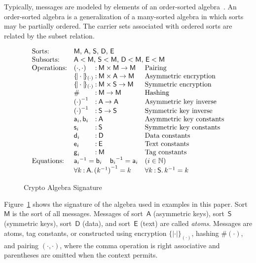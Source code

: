 \documentclass[12pt]{article}
\newcommand{\cn}[1]{\ensuremath{\operatorname{\mathsf{#1}}}}
\newcommand{\srt}[1]{\ensuremath{\mathsf{#1}}}
\newcommand{\typ}{\mathbin:}
\newcommand{\enc}[2]{\ensuremath{\{\!|#1|\!\}_{#2}}}
\newcommand{\invk}[1]{{#1}^{-1}}
\newcommand{\tg}[1]{\cn{g}_{#1}}
\newcommand{\nat}{\ensuremath{\mathbb{N}}}
\newcommand{\all}[1]{\forall#1\mathpunct.}
\begin{document}
Typically, messages are modeled by elements of an order-sorted
algebra~\cite{GoguenMeseguer92}. An order-sorted algebra is a
generalization of a many-sorted algebra in which sorts may be
partially ordered.  The carrier sets associated with ordered sorts are
related by the subset relation.

\begin{figure}
$$\begin{array}{ll@{{}\typ{}}ll}
\mbox{Sorts:}&
\multicolumn{3}{l}{\mbox{$\srt{M}$, $\srt{A}$,
    $\srt{S}$, $\srt{D}$, $\srt{E}$}}\\
\mbox{Subsorts:}&
\multicolumn{3}{l}{\mbox{$\srt{A}<\srt{M}$, $\srt{S}<\srt{M}$,
    $\srt{D}<\srt{M}$, $\srt{E}<\srt{M}$}}\\
\mbox{Operations:}&(\cdot,\cdot)&\srt{M}\times\srt{M}\to\srt{M}& \mbox{Pairing}\\
&\enc{\cdot}{(\cdot)}&\srt{M}\times\srt{A}\to\srt{M}&\mbox{Asymmetric encryption}\\
&\enc{\cdot}{(\cdot)}&\srt{M}\times\srt{S}\to\srt{M}&\mbox{Symmetric encryption}\\
&\#&\srt{\srt{M}}\to\srt{M}& \mbox{Hashing}\\
&\invk{(\cdot)}&\srt{A}\to\srt{A}& \mbox{Asymmetric key inverse}\\
&\invk{(\cdot)}&\srt{S}\to\srt{S}& \mbox{Symmetric key inverse}\\
&\cn{a}_i,\cn{b}_i&\srt{A}& \mbox{Asymmetric key constants}\\
&\cn{s}_i&\srt{S}& \mbox{Symmetric key constants}\\
&\cn{d}_i&\srt{D}& \mbox{Data constants}\\
&\cn{e}_i&\srt{E}& \mbox{Text constants}\\
&\tg{i}&\srt{M}& \mbox{Tag constants}\\
\mbox{Equations:}&\multicolumn{2}{l}{\invk{\cn{a}_i}=\cn{b}_i\quad
\invk{\cn{b}_i}=\cn{a}_i}
&(i\in\nat)\\
&\multicolumn{2}{l}{\all{k\typ\srt{A}}\invk{(\invk{k})}=k}
&\all{k\typ\srt{S}}\invk{k}=k
\end{array}$$
\caption{Crypto Algebra Signature}\label{fig:algebra signature}
\end{figure}

Figure~\ref{fig:algebra signature} shows the signature of the algebra
used in examples in this paper.  Sort~$\srt{M}$ is the sort of all
messages.  Messages of sort~$\srt{A}$ (asymmetric keys),
sort~$\srt{S}$ (symmetric keys), sort~$\srt{D}$ (data), and
sort~$\srt{E}$ (text) are called \emph{atoms}.  Messages are atoms,
tag constants, or constructed using encryption $\enc{\cdot}{(\cdot)}$,
hashing $\#(\cdot)$, and pairing $(\cdot,\cdot)$, where the comma
operation is right associative and parentheses are omitted when the
context permits.
\end{document}
